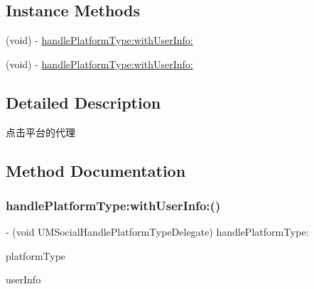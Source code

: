 \subsection*{Instance Methods}
\begin{DoxyCompactItemize}
\item 
(void) -\/ \mbox{\hyperlink{protocol_u_m_social_handle_platform_type_delegate_01-p_a204492c5bca7a7799de17ed3bab26c5c}{handle\+Platform\+Type\+:with\+User\+Info\+:}}
\item 
(void) -\/ \mbox{\hyperlink{protocol_u_m_social_handle_platform_type_delegate_01-p_a204492c5bca7a7799de17ed3bab26c5c}{handle\+Platform\+Type\+:with\+User\+Info\+:}}
\end{DoxyCompactItemize}


\subsection{Detailed Description}
点击平台的代理 

\subsection{Method Documentation}
\mbox{\label{protocol_u_m_social_handle_platform_type_delegate_01-p_a204492c5bca7a7799de17ed3bab26c5c}} 
\subsubsection{\texorpdfstring{handle\+Platform\+Type\+:with\+User\+Info\+:()}{handlePlatformType:withUserInfo:()}\hspace{0.1cm}{\footnotesize\ttfamily [1/2]}}
{\footnotesize\ttfamily -\/ (void U\+M\+Social\+Handle\+Platform\+Type\+Delegate) handle\+Platform\+Type\+: \begin{DoxyParamCaption}\item[{(U\+M\+Social\+Platform\+Type)}]{platform\+Type }\item[{withUserInfo:(N\+S\+Dictionary $\ast$)}]{user\+Info }\end{DoxyParamCaption}\hspace{0.3cm}{\ttfamily [optional]}}

